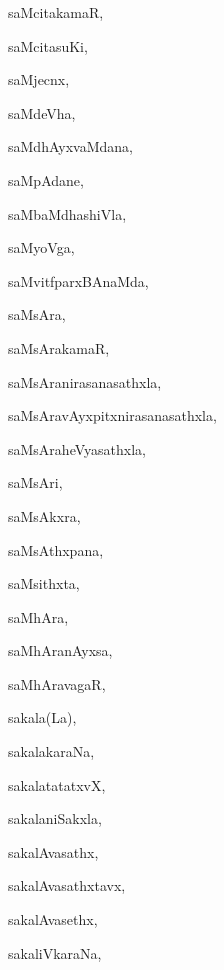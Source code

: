 \begin{multicols}{3}
{\noindent
{saMcitakamaR}, \pageref{saMcitakamaR}

\noindent
{saMcitasuKi}, \pageref{saMcitasuKi}

\noindent
{saMjecnx}, \pageref{saMjecnx}

\noindent
{saMdeVha}, \pageref{saMdeVha}

\noindent
{saMdhAyxvaMdana}, \pageref{saMdhAyxvaMdana}

\noindent
{saMpAdane}, \pageref{saMpAdane}

\noindent
{saMbaMdhashiVla}, \pageref{saMbaMdhashiVla}

\noindent
{saMyoVga}, \pageref{saMyoVga}

\noindent
{saMvitfparxBAnaMda}, \pageref{saMvitfparxBAnaMda}

\noindent
{saMsAra}, \pageref{saMsAra}

\noindent
{saMsArakamaR}, \pageref{saMsArakamaR}

\noindent
{saMsAranirasanasathxla}, \pageref{saMsAranirasanasathxla}

\noindent
{saMsAravAyxpitxnirasanasathxla}, \pageref{saMsAravAyxpitxnirasanasathxla}

\noindent
{saMsAraheVyasathxla}, \pageref{saMsAraheVyasathxla}

\noindent
{saMsAri}, \pageref{saMsAri}

\noindent
{saMsAkxra}, \pageref{saMsAkxra}

\noindent
{saMsAthxpana}, \pageref{saMsAthxpana}

\noindent
{saMsithxta}, \pageref{saMsithxta}

\noindent
{saMhAra}, \pageref{saMhAra}

\noindent
{saMhAranAyxsa}, \pageref{saMhAranAyxsa}

\noindent
{saMhAravagaR}, \pageref{saMhAravagaR}

\noindent
{sakala(La)}, \pageref{sakalaLa}

\noindent
{sakalakaraNa}, \pageref{sakalakaraNa}

\noindent
{sakalatatatxvX}, \pageref{sakalatatatxvX}

\noindent
{sakalaniSakxla}, \pageref{sakalaniSakxla}

\noindent
{sakalAvasathx}, \pageref{sakalAvasathx}

\noindent
{sakalAvasathxtavx}, \pageref{sakalAvasathxtavx}

\noindent
{sakalAvasethx}, \pageref{sakalAvasethx}

\noindent
{sakaliVkaraNa}, \pageref{sakaliVkaraNa}

}
\end{multicols}
